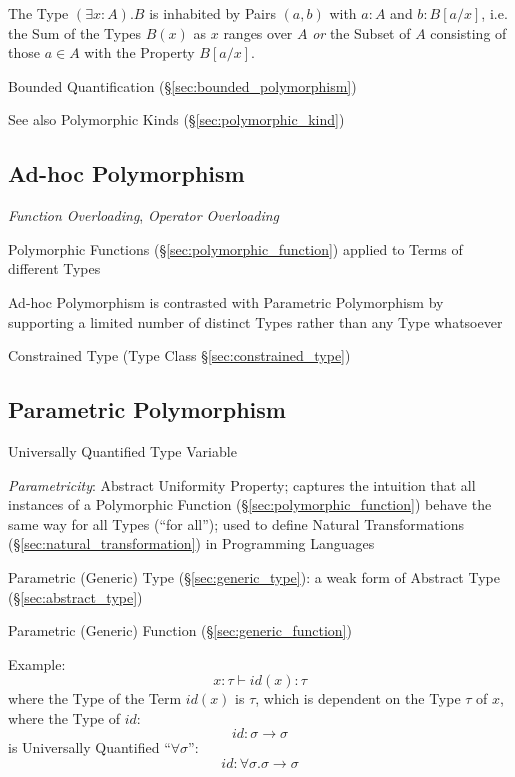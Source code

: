 The Type $(\exists x : A).B$ is inhabited by Pairs $(a,b)$ with $a:A$
and $b:B[a/x]$, i.e. the Sum of the Types $B(x)$ as $x$ ranges over
$A$ \emph{or} the Subset of $A$ consisting of those $a \in A$ with the
Property $B[a/x]$.

Bounded Quantification (\S\ref{sec:bounded_polymorphism})

\fist See also Polymorphic Kinds (\S\ref{sec:polymorphic_kind})



\subsection{Ad-hoc Polymorphism}\label{sec:adhoc_polymorphism}

\emph{Function Overloading}, \emph{Operator Overloading}

Polymorphic Functions (\S\ref{sec:polymorphic_function}) applied to
Terms of different Types

Ad-hoc Polymorphism is contrasted with Parametric Polymorphism by
supporting a limited number of distinct Types rather than any Type
whatsoever

Constrained Type (Type Class \S\ref{sec:constrained_type})



\subsection{Parametric Polymorphism}\label{sec:parametric_polymorphism}

Universally Quantified Type Variable

\emph{Parametricity}: Abstract Uniformity Property; captures the
intuition that all instances of a Polymorphic Function
(\S\ref{sec:polymorphic_function}) behave the same way for all Types
(``for all''); used to define Natural Transformations
(\S\ref{sec:natural_transformation}) in Programming Languages

Parametric (Generic) Type (\S\ref{sec:generic_type}): a weak form of
Abstract Type (\S\ref{sec:abstract_type})

Parametric (Generic) Function (\S\ref{sec:generic_function})

Example:
\[
  x:\tau \vdash id(x):\tau
\]
where the Type of the Term $id(x)$ is $\tau$, which is dependent on
the Type $\tau$ of $x$, where the Type of $id$:
\[
  id:\sigma \rightarrow \sigma
\]
is Universally Quantified ``$\forall \sigma$'':
\[
  id:\forall \sigma.\sigma \rightarrow \sigma
\]


